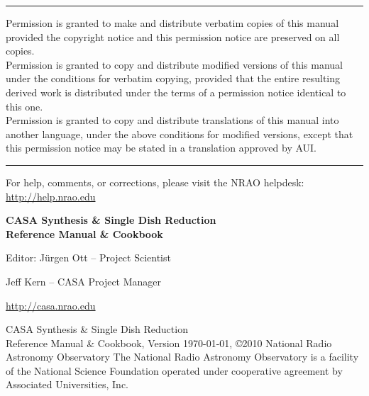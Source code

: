 \pagestyle{empty}

\small
\hrule
\vspace{2mm}
\noindent Permission is granted to make and distribute verbatim
copies of this manual provided the copyright notice and this
permission notice are preserved on all copies. \\
\noindent Permission is granted to copy and distribute modified versions of this
manual under the conditions for verbatim copying, provided that the
entire resulting derived work is distributed under the terms of a
permission notice identical to this one. \\
\noindent Permission is granted to copy and distribute translations of
this manual into another language, under the above conditions for
modified versions, except that this permission notice may be stated in
a translation approved by AUI.\\
\hrule
\vspace{2mm}
\normalsize
\vfill
\noindent For help, comments, or corrections, please visit the NRAO helpdesk:\\ \url{http://help.nrao.edu}
\normalsize

\pagebreak


\begin{center}
\LARGE
{\bf CASA Synthesis \& Single Dish Reduction\\ Reference Manual \& Cookbook} 

\vspace{3cm}



\Large
{Editor: J\"urgen Ott -- Project Scientist}

\vspace{1cm}

{Jeff Kern -- CASA Project Manager}

\normalsize
\vspace{3cm}
{\Large \url{http://casa.nrao.edu}}\\
\vspace{2cm}
\end{center}
\vfill


\begin{center}
{\sc CASA Synthesis \& Single Dish Reduction\\ Reference Manual \& Cookbook}, 
\break
Version \today,
\break
\copyright 2010 National Radio Astronomy Observatory
\break
\break
The National Radio Astronomy Observatory is a facility of the National
Science Foundation operated under cooperative agreement by Associated
Universities, Inc.\\[1cm]
\end{center}


